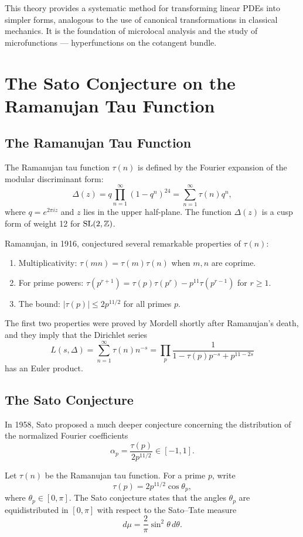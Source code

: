 This theory provides a systematic method for transforming linear PDEs into simpler forms, analogous to the use of canonical transformations in classical mechanics. It is the foundation of microlocal analysis and the study of microfunctions --- hyperfunctions on the cotangent bundle.

\section{The Sato Conjecture on the Ramanujan Tau Function}

\subsection{The Ramanujan Tau Function}

The Ramanujan tau function \(\tau(n)\) is defined by the Fourier expansion of the modular discriminant form:
\[
\Delta(z) = q \prod_{n=1}^\infty (1 - q^n)^{24} = \sum_{n=1}^\infty \tau(n) q^n,
\]
where \(q = e^{2\pi i z}\) and \(z\) lies in the upper half-plane. The function \(\Delta(z)\) is a cusp form of weight 12 for \(\operatorname{SL}(2,\mathbb{Z})\).

Ramanujan, in 1916, conjectured several remarkable properties of \(\tau(n)\):
\begin{enumerate}
    \item Multiplicativity: \(\tau(mn) = \tau(m)\tau(n)\) when \(m,n\) are coprime.
    \item For prime powers: \(\tau(p^{r+1}) = \tau(p)\tau(p^r) - p^{11}\tau(p^{r-1})\) for \(r \geq 1\).
    \item The bound: \(|\tau(p)| \leq 2 p^{11/2}\) for all primes \(p\).
\end{enumerate}

The first two properties were proved by Mordell shortly after Ramanujan's death, and they imply that the Dirichlet series
\[
L(s, \Delta) = \sum_{n=1}^\infty \tau(n) n^{-s} = \prod_p \frac{1}{1 - \tau(p) p^{-s} + p^{11-2s}}
\]
has an Euler product.

\subsection{The Sato Conjecture}

In 1958, Sato proposed a much deeper conjecture concerning the distribution of the normalized Fourier coefficients
\[
\alpha_p = \frac{\tau(p)}{2 p^{11/2}} \in [-1, 1].
\]

\begin{condition}
Let \(\tau(n)\) be the Ramanujan tau function. For a prime \(p\), write
\[
\tau(p) = 2 p^{11/2} \cos \theta_p,
\]
where \(\theta_p \in [0, \pi]\). The Sato conjecture states that the angles \(\theta_p\) are equidistributed in \([0,\pi]\) with respect to the Sato--Tate measure
\[
d\mu = \frac{2}{\pi} \sin^2 \theta \, d\theta.
\]
\end{condition}

